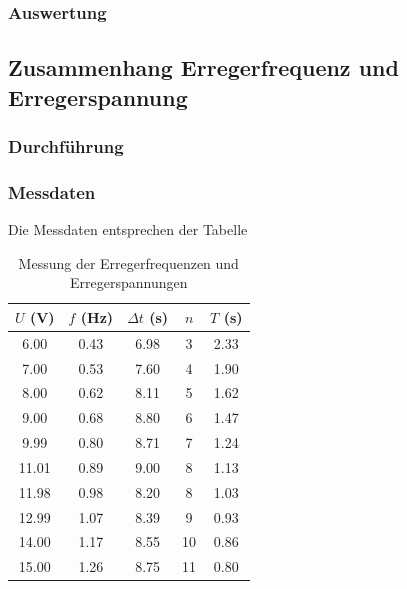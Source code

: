 \documentclass{article}
\begin{document}
\subsubsection{Auswertung}

\subsection{Zusammenhang Erregerfrequenz und Erregerspannung}
\subsubsection{Durchführung}
\subsubsection{Messdaten}
Die Messdaten entsprechen der Tabelle

\begin{table}[H]
    \centering
    \begin{tabular}{|c|c|c|c|c|}
    \hline
    $U$ (V) & $f$ (Hz) & $\Delta t$ (s) & $n$ & $T$ (s) \\
    \hline
    6.00 & 0.43 & 6.98 & 3 & 2.33 \\
    7.00 & 0.53 & 7.60 & 4 & 1.90 \\
    8.00 & 0.62 & 8.11 & 5 & 1.62 \\
    9.00 & 0.68 & 8.80 & 6 & 1.47 \\
    9.99 & 0.80 & 8.71 & 7 & 1.24 \\
    11.01 & 0.89 & 9.00 & 8 & 1.13 \\
    11.98 & 0.98 & 8.20 & 8 & 1.03 \\
    12.99 & 1.07 & 8.39 & 9 & 0.93 \\
    14.00 & 1.17 & 8.55 & 10 & 0.86 \\
    15.00 & 1.26 & 8.75 & 11 & 0.80 \\
    \hline
    \end{tabular}
    \caption{Messung der Erregerfrequenzen und Erregerspannungen}
    \label{tab:messung_erregerfrequenz_spannung}
\end{table}
\end{document}

